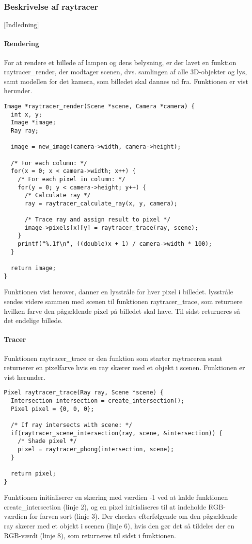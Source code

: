 \subsubsection{Beskrivelse af raytracer}
[Indledning]
\paragraph{Rendering}
For at rendere et billede af lampen og dens belysning, er der lavet en funktion raytracer\_render, der modtager scenen, dvs. samlingen af alle 3D-objekter og lys, samt modellen for det kamera, som billedet skal dannes ud fra. Funktionen er vist herunder.

\begin{lstlisting}[style=Cstyle, caption=Funktionen der rendere billedet af scenen med et kameras perspektiv]
Image *raytracer_render(Scene *scene, Camera *camera) {
  int x, y;
  Image *image;
  Ray ray;

  image = new_image(camera->width, camera->height);
  
  /* For each column: */
  for(x = 0; x < camera->width; x++) {
    /* For each pixel in column: */
    for(y = 0; y < camera->height; y++) {
      /* Calculate ray */
      ray = raytracer_calculate_ray(x, y, camera);
      
      /* Trace ray and assign result to pixel */
      image->pixels[x][y] = raytracer_trace(ray, scene);
    }
    printf("%.1f\n", ((double)x + 1) / camera->width * 100);
  }

  return image;
}
\end{lstlisting}

Funktionen vist herover, danner en lysstråle for hver pixel i billedet. lysstråle sendes videre sammen med scenen til funktionen raytracer\_trace, som returnere hvilken farve den pågældende pixel på billedet skal have. Til sidst returneres så det endelige billede.

\paragraph{Tracer}
Funktionen raytracer\_trace er den funktion som starter raytraceren samt returnerer en pixelfarve hvis en ray skærer med et objekt i scenen. Funktionen er vist herunder.  

\begin{lstlisting} 
Pixel raytracer_trace(Ray ray, Scene *scene) {
  Intersection intersection = create_intersection();
  Pixel pixel = {0, 0, 0};
  
  /* If ray intersects with scene: */
  if(raytracer_scene_intersection(ray, scene, &intersection)) {
    /* Shade pixel */
    pixel = raytracer_phong(intersection, scene);
  }
  
  return pixel;
}
\end{lstlisting}
Funktionen initialiserer en skæring med værdien -1 ved at kalde funktionen create\_intersection (linje 2), og en pixel initialiseres til at indeholde RGB-værdien for farven sort (linje 3). Der checkes efterfølgende om den pågældende ray skærer med et objekt i scenen (linje 6), hvis den gør det så tildeles der en RGB-værdi (linje 8), som returneres til sidst i funktionen. 

